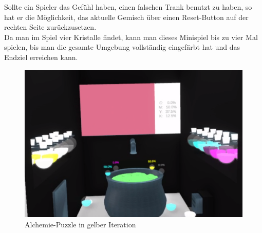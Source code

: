 Sollte ein Spieler das Gefühl haben, einen falschen Trank benutzt zu haben, so hat er die Möglichkeit, das aktuelle Gemisch über einen Reset-Button auf der rechten Seite zurückzusetzen.\\
Da man im Spiel vier Kristalle findet, kann man dieses Minispiel bis zu vier Mal spielen, bis man die gesamte Umgebung vollständig eingefärbt hat und das Endziel erreichen kann.

\begin{figure}[h]
	\centering
	\includegraphics[width=\textwidth/2]{Pictures/Alchemie_Final}
	\caption{Alchemie-Puzzle in gelber Iteration}
	\label{fig:alchemie_final}
\end{figure}\newpage \noindent

